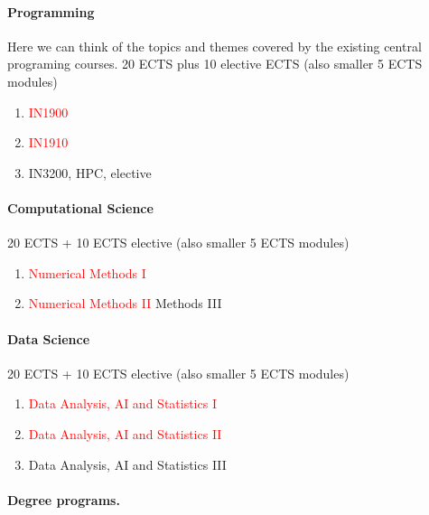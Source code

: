 \documentclass[oneside,final,10pt]{article}
\begin{document}
\paragraph{Programming}
Here we can think of the topics and themes covered by the existing central programing courses.
20 ECTS plus 10 elective ECTS (also smaller 5 ECTS modules)
\begin{enumerate}
    \item \textcolor{red}{IN1900}
    \item \textcolor{red}{IN1910}
    \item IN3200, HPC, elective
\end{enumerate}


\paragraph{Computational Science}
20 ECTS + 10 ECTS elective (also smaller 5 ECTS modules)
\begin{enumerate}
    \item \textcolor{red}{Numerical Methods I}
    \item \textcolor{red}{Numerical Methods II}
    \itemNumerical Methods III
\end{enumerate}

\paragraph{Data Science}
20 ECTS + 10 ECTS elective (also smaller 5 ECTS modules)
\begin{enumerate}
    \item \textcolor{red}{Data Analysis, AI and Statistics I}
    \item \textcolor{red}{Data Analysis, AI and Statistics II}
    \item Data Analysis, AI and Statistics III
\end{enumerate}




\paragraph{Degree programs.}
\end{document}
